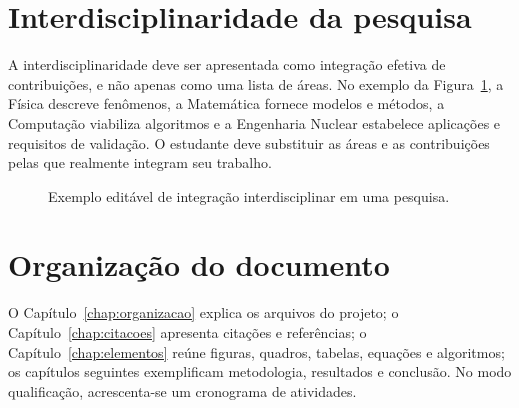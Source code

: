 \section{Interdisciplinaridade da pesquisa}
A interdisciplinaridade deve ser apresentada como integração efetiva de contribuições, e não apenas como uma lista de áreas. No exemplo da Figura~\ref{fig:interdisciplinaridade}, a Física descreve fenômenos, a Matemática fornece modelos e métodos, a Computação viabiliza algoritmos e a Engenharia Nuclear estabelece aplicações e requisitos de validação. O estudante deve substituir as áreas e as contribuições pelas que realmente integram seu trabalho.
\begin{figure}[htbp]\centering
\resizebox{\textwidth}{!}{}
\caption{Exemplo editável de integração interdisciplinar em uma pesquisa.}\label{fig:interdisciplinaridade}
\end{figure}

\section{Organização do documento}
O Capítulo~\ref{chap:organizacao} explica os arquivos do projeto; o Capítulo~\ref{chap:citacoes} apresenta citações e referências; o Capítulo~\ref{chap:elementos} reúne figuras, quadros, tabelas, equações e algoritmos; os capítulos seguintes exemplificam metodologia, resultados e conclusão. No modo qualificação, acrescenta-se um cronograma de atividades.
